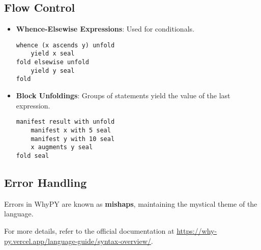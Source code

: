 \documentclass[11pt]{article}
\begin{document}
\subsection{Flow Control}
\begin{itemize}
    \item \textbf{Whence-Elsewise Expressions}: Used for conditionals.
    \begin{lstlisting}
whence (x ascends y) unfold
    yield x seal
fold elsewise unfold
    yield y seal
fold
    \end{lstlisting}
    \item \textbf{Block Unfoldings}: Groups of statements yield the value of the last expression.
    \begin{lstlisting}
manifest result with unfold
    manifest x with 5 seal
    manifest y with 10 seal
    x augments y seal
fold seal
    \end{lstlisting}
\end{itemize}

\subsection{Error Handling}
Errors in WhyPY are known as \textbf{mishaps}, maintaining the mystical theme of the language.

For more details, refer to the official documentation at \url{https://why-py.vercel.app/language-guide/syntax-overview/}.
\end{document}
